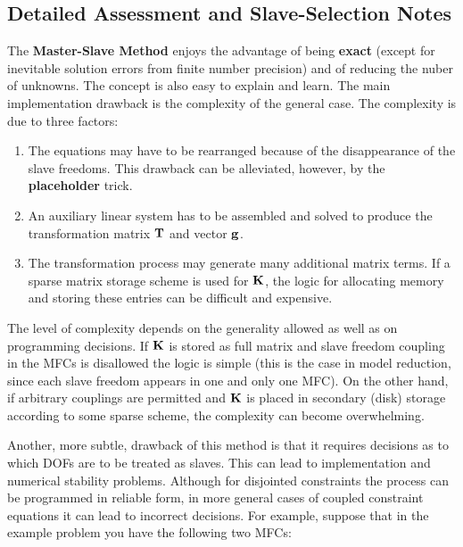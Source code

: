 \subsection{Detailed Assessment and Slave-Selection Notes}

The \textbf{Master-Slave Method} enjoys the advantage of being \textbf{exact}
(except for inevitable solution errors from finite number precision) and of
reducing the nuber of unknowns. The concept is also easy to explain and learn.
The main implementation drawback is the complexity of the general case.
The complexity is due to three factors:

\begin{enumerate}
    \item The equations may have to be rearranged because of the disappearance
        of the slave freedoms. This drawback can be alleviated, however,
        by the \textbf{placeholder} trick.

    \item An auxiliary linear system has to be assembled and solved to produce
        the transformation matrix $ \mathbf{T} $ and vector $ \mathbf{g} $.

    \item The transformation process may generate many additional matrix terms.
        If a sparse matrix storage scheme is used for $ \mathbf{K} $, the logic
        for allocating memory and storing these entries can be difficult
        and expensive.
\end{enumerate}

The level of complexity depends on the generality allowed as well as on programming
decisions. If $ \mathbf{K} $  is stored as full matrix and slave freedom coupling in
the MFCs is disallowed the logic is simple (this is the case in model reduction,
since each slave freedom appears in one and only one MFC). On the other hand,
if arbitrary couplings are permitted and $ \mathbf{K} $ is placed in secondary
(disk) storage according to some sparse scheme, the complexity can become
overwhelming.

Another, more subtle, drawback of this method is that it requires decisions as to
which DOFs are to be treated as slaves. This can lead to implementation and numerical
stability problems. Although for disjointed constraints the process can be programmed
in reliable form, in more general cases of coupled constraint equations it can
lead to incorrect decisions. For example, suppose that in the example problem
you have the following two MFCs:

